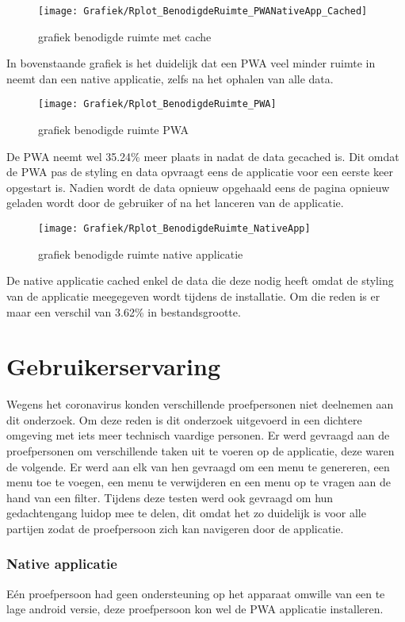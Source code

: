 \begin{figure}[H]
	\texttt{[image: Grafiek/Rplot\_BenodigdeRuimte\_PWANativeApp\_Cached]}\centering
	\caption{grafiek benodigde ruimte met cache}
\end{figure}
In bovenstaande grafiek is het duidelijk dat een PWA veel minder ruimte in neemt dan een native applicatie, zelfs na het ophalen van alle data.

\begin{figure}[H]
	\texttt{[image: Grafiek/Rplot\_BenodigdeRuimte\_PWA]}\centering
	\caption{grafiek benodigde ruimte PWA}
\end{figure}
De PWA neemt wel 35.24\% meer plaats in nadat de data gecached is. Dit omdat de PWA pas de styling en data opvraagt eens de applicatie voor een eerste keer opgestart is. Nadien wordt de data opnieuw opgehaald eens de pagina opnieuw geladen wordt door de gebruiker of na het lanceren van de applicatie.

\begin{figure}[H]
	\texttt{[image: Grafiek/Rplot\_BenodigdeRuimte\_NativeApp]}\centering
	\caption{grafiek benodigde ruimte native applicatie}
\end{figure}
De native applicatie cached enkel de data die deze nodig heeft omdat de styling van de applicatie meegegeven wordt tijdens de installatie. Om die reden is er maar een verschil van 3.62\% in bestandsgrootte.

\section{Gebruikerservaring}
Wegens het coronavirus konden verschillende proefpersonen niet deelnemen aan dit onderzoek. Om deze reden is dit onderzoek uitgevoerd in een dichtere omgeving met iets meer technisch vaardige personen. Er werd gevraagd aan de proefpersonen om verschillende taken uit te voeren op de applicatie, deze waren de volgende. Er werd aan elk van hen gevraagd om een menu te genereren, een menu toe te voegen, een menu te verwijderen en een menu op te vragen aan de hand van een filter. Tijdens deze testen werd ook gevraagd om hun gedachtengang luidop mee te delen, dit omdat het zo duidelijk is voor alle partijen zodat de proefpersoon zich kan navigeren door de applicatie.

\subsubsection{Native applicatie}
Eén proefpersoon had geen ondersteuning op het apparaat omwille van een te lage android versie, deze proefpersoon kon wel de PWA applicatie installeren.

